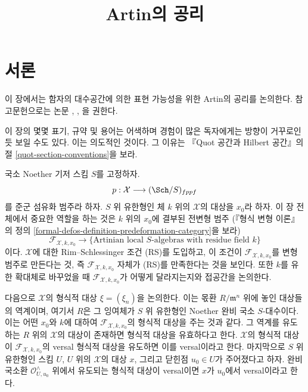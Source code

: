 



\title{Artin의 공리}

\maketitle

\label{section-phantom}

\tableofcontents




\section{서론}
\label{section-introduction}

\noindent
이 장에서는 함자의 대수공간에 의한 표현 가능성을 위한 Artin의 공리를
논의한다. 참고문헌으로는 논문
\cite{ArtinI}, \cite{ArtinII}, \cite{ArtinVersal}을 권한다.

\medskip\noindent
이 장의 몇몇 표기, 규약 및 용어는 어색하며 경험이 많은 독자에게는
방향이 거꾸로인 듯 보일 수도 있다. 이는 의도적인 것이다.
그 이유는 『Quot 공간과 Hilbert 공간』의 절
\ref{quot-section-conventions}을 보라.

\medskip\noindent
국소 Noether 기저 스킴 $S$를 고정하자.
$$
p : \mathcal{X} \longrightarrow (\Sch/S)_{fppf}
$$
를 준군 섬유화 범주라 하자. $S$ 위 유한형인 체 $k$ 위의
$\mathcal{X}$의 대상을 $x_0$라 하자. 이 장 전체에서 중요한 역할을
하는 것은 $k$ 위의 $x_0$에 결부된 전변형 범주
(『형식 변형 이론』의 정의
\ref{formal-defos-definition-predeformation-category}을 보라)
$$
\mathcal{F}_{\mathcal{X}, k, x_0}
\longrightarrow
\{\text{Artinian local }S\text{-algebras with residue field }k\}
$$
이다. $\mathcal{X}$에 대한 Rim--Schlessinger 조건 (RS)를 도입하고,
이 조건이 $\mathcal{F}_{\mathcal{X}, k, x_0}$를 변형 범주로 만든다는 것,
즉 $\mathcal{F}_{\mathcal{X}, k, x_0}$ 자체가 (RS)를 만족한다는 것을
보인다. 또한 $k$를 유한 확대체로 바꾸었을 때
$\mathcal{F}_{\mathcal{X}, k, x_0}$가 어떻게 달라지는지와
접공간을 논의한다.

\medskip\noindent
다음으로 $\mathcal{X}$의 형식적 대상 $\xi = (\xi_n)$을 논의한다.
이는 몫환 $R/\mathfrak m^n$ 위에 놓인 대상들의 역계이며, 여기서
$R$은 그 잉여체가 $S$ 위 유한형인 Noether 완비 국소 $S$-대수이다.
이는 어떤 $x_0$와 $k$에 대하여
$\mathcal{F}_{\mathcal{X}, k, x_0}$의 형식적 대상을 주는 것과 같다.
그 역계를 유도하는 $R$ 위의 $\mathcal{X}$의 대상이 존재하면
형식적 대상을 유효하다고 한다. $\mathcal{X}$의 형식적 대상이
$\mathcal{F}_{\mathcal{X}, k, x_0}$의 versal 형식적 대상을 유도하면
이를 versal이라고 한다. 마지막으로 $S$ 위 유한형인 스킴 $U$,
$U$ 위의 $\mathcal{X}$의 대상 $x$, 그리고 닫힌점 $u_0 \in U$가
주어졌다고 하자. 완비 국소환 $\mathcal{O}_{U, u_0}^\wedge$ 위에서
유도되는 형식적 대상이 versal이면 $x$가 $u_0$에서 versal이라고 한다.

